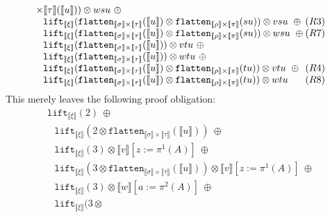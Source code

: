 \documentclass[runningheads,a4paper]{llncs}
\newcommand{\typeinterpret}[1]{\llbracket #1 \rrbracket}
\newcommand{\interpret}[1]{\llbracket #1 \rrbracket}
\newcommand{\flatten}{\mathtt{flatten}}
\newcommand{\lift}{\mathtt{lift}}
\begin{document}
\begin{itemize}
\[\begin{array}{l}
{    \times \typeinterpret{\tau}}(\interpret{u})) \otimes wsu\ \oplus \\
  \phantom{A}
    \lift_{\typeinterpret{\xi}}(\flatten_{\typeinterpret{\sigma}
    \times \typeinterpret{\tau}}(\interpret{u}) \otimes
    \flatten_{\typeinterpret{\rho} \times
    \typeinterpret{\pi}}(su)) \otimes vsu\ \oplus \hfill (R3) \\
  \phantom{A}
    \lift_{\typeinterpret{\xi}}(\flatten_{\typeinterpret{\sigma}
    \times \typeinterpret{\tau}}(\interpret{u}) \otimes
    \flatten_{\typeinterpret{\rho}
    \times \typeinterpret{\pi}}(su)) \otimes wsu\ \oplus \hfill (R7) \\
  \phantom{A}
    \lift_{\typeinterpret{\xi}}(\flatten_{\typeinterpret{\sigma}
    \times \typeinterpret{\tau}}(\interpret{u})) \otimes vtu\ \oplus \\
  \phantom{A}
    \lift_{\typeinterpret{\xi}}(\flatten_{\typeinterpret{\sigma}
    \times \typeinterpret{\tau}}(\interpret{u})) \otimes wtu\ \oplus \\
  \phantom{A}
    \lift_{\typeinterpret{\xi}}(\flatten_{\typeinterpret{\sigma}
    \times \typeinterpret{\tau}}(\interpret{u}) \otimes
    \flatten_{\typeinterpret{\rho} \times
    \typeinterpret{\pi}}(tu)) \otimes vtu\ \oplus \hfill (R4) \\
  \phantom{A}
    \lift_{\typeinterpret{\xi}}(\flatten_{\typeinterpret{\sigma}
    \times \typeinterpret{\tau}}(\interpret{u}) \otimes
    \flatten_{\typeinterpret{\rho}
    \times \typeinterpret{\pi}}(tu)) \otimes wtu \hfill (R8)
  \end{array}
  \]
  This merely leaves the following proof obligation:
  \[
  \begin{array}{l}
  \lift_{\typeinterpret{\xi}}(2)\ \oplus \\
  \phantom{A}
     \lift_{\typeinterpret{\xi}}(2 \otimes
      \flatten_{\typeinterpret{\sigma} \times \typeinterpret{\tau}}(
      \interpret{u}))\ \oplus \\
  \phantom{A}
    \lift_{\typeinterpret{\xi}}(3) \otimes \interpret{v}[z:=\pi^1(A)]
    \ \oplus \\
  \phantom{A}
    \lift_{\typeinterpret{\xi}}(3 \otimes
    \flatten_{\typeinterpret{\sigma} \times \typeinterpret{\tau}}(
    \interpret{u})) \otimes
     \interpret{v}[z:=\pi^1(A)]
    \ \oplus \\
  \phantom{A}
    \lift_{\typeinterpret{\xi}}(3) \otimes \interpret{w}[a:=\pi^2(A)]
    \ \oplus \\
  \phantom{A}
    \lift_{\typeinterpret{\xi}}(3 \otimes

\end{array}\]
\end{itemize}
\end{document}
